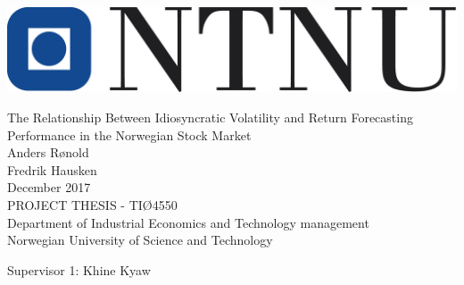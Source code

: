 \thispagestyle{empty}
\includegraphics[scale=0.4]{Pictures/ntnu.png}
\mbox{}\\[6pc]
\begin{center}
\Huge{The Relationship Between Idiosyncratic Volatility and Return Forecasting Performance in the Norwegian Stock Market}\\[2pc]

\Large{Anders Rønold \\ Fredrik Hausken}\\[1pc]
\large{December 2017}\\[2pc]

PROJECT THESIS - TIØ4550\\
Department of Industrial Economics and Technology management\\
Norwegian University of Science and Technology
\end{center}
\vfill

\noindent Supervisor 1: Khine Kyaw


